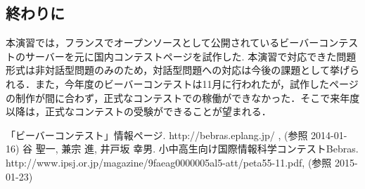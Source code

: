 \documentclass[a4paper]{jarticle}
\begin{document}
\begin{multicols}{2}
\section{終わりに}
本演習では，フランスでオープンソースとして公開されているビーバーコンテストのサーバーを元に国内コンテストページを試作した. 本演習で対応できた問題形式は非対話型問題のみのため，対話型問題への対応は今後の課題として挙げられる．また，今年度のビーバーコンテストは11月に行われたが，試作したページの制作が間に合わず，正式なコンテストでの稼働ができなかった．そこで来年度以降は，正式なコンテストの受験ができることが望まれる．

\end{multicols}

\begin{thebibliography}{1}

 「ビーバーコンテスト」情報ページ.  http://bebras.eplang.jp/ , (参照 2014-01-16)
 谷 聖一, 兼宗 進, 井戸坂 幸男. 小中高生向け国際情報科学コンテストBebras.  http://www.ipsj.or.jp/magazine/9faeag0000005al5-att/peta55-11.pdf, (参照 2015-01-23)



\end{thebibliography}
\end{document}
